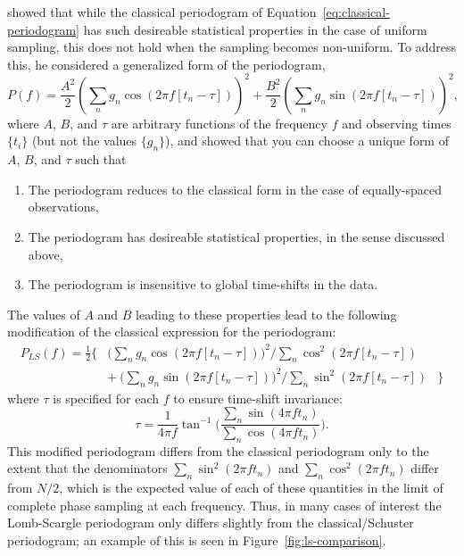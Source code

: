 \documentclass[preprint]{aastex}
\newcommand{\fig}[1]{Figure~\ref{fig:#1}}
\newcommand{\Eq}[1]{Equation~\ref{eq:#1}}
\newcommand{\eq}[1]{\Eq{#1}}
\newcommand{\eqlabel}[1]{\label{eq:#1}}
\begin{document}
\citet{Scargle82} showed that while the classical periodogram of
\eq{classical-periodogram} has such desireable statistical properties
in the case of uniform sampling, this does not hold
when the sampling becomes non-uniform.
To address this, he considered a generalized form of the periodogram,
\begin{equation}
  P(f) = \frac{A^2}{2}\left(\sum_n g_n \cos(2\pi f [t_n-\tau])\right)^2
       + \frac{B^2}{2} \left(\sum_n g_n \sin(2\pi f [t_n-\tau])\right)^2,
\end{equation}
where $A$, $B$, and $\tau$ are arbitrary functions of the frequency $f$ and
observing times $\{t_i\}$ (but not the values $\{g_n\}$), and showed
that you can choose a unique form of $A$, $B$, and $\tau$ such that
\begin{enumerate}
  \item The periodogram reduces to the classical form in the case of equally-spaced observations,
  \item The periodogram has desireable statistical properties, in the sense discussed above,
  \item The periodogram is insensitive to global time-shifts in the data.
\end{enumerate}
The values of $A$ and $B$ leading to these properties lead to the following
modification of the classical expression for the periodogram:
\begin{eqnarray}
  P_{LS}(f) =
  \frac{1}{2} \Bigg\{ &
  \bigg(\sum_n g_n \cos(2\pi f [t_n-\tau])\bigg)^2 \bigg/
  \sum_n \cos^2(2\pi f [t_n-\tau]) &\nonumber\\
  & + ~ \bigg(\sum_n g_n \sin(2\pi f [t_n-\tau])\bigg)^2 \bigg/
  \sum_n \sin^2(2\pi f [t_n-\tau]) & \Bigg\}
  \eqlabel{lomb-scargle-periodogram}
\end{eqnarray}
where $\tau$ is specified for each $f$ to ensure time-shift invariance:
\begin{equation}
  \tau = \frac{1}{4\pi f}\tan^{-1}\Bigg(
  \frac{\sum_n \sin(4\pi f t_n)}{\sum_n \cos(4\pi f t_n)}\Bigg).
  \eqlabel{tau-def}
\end{equation}
This modified periodogram differs from the classical periodogram only to
the extent that the denominators $\sum_n \sin^2(2\pi f t_n)$ and
$\sum_n \cos^2(2\pi f t_n)$ differ from $N/2$, which is the expected value of
each of these quantities in the limit of complete phase sampling at each
frequency.
Thus, in many cases of interest the Lomb-Scargle periodogram only differs
slightly from the classical/Schuster periodogram; an example of this is seen
in \fig{ls-comparison}.
\end{document}
